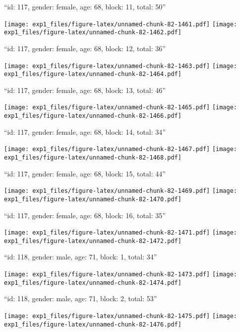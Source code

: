 \documentclass[11pt,,]{article}
\begin{document}
\newpage
[1] 

``id: 117, gender: female, age: 68, block: 11, total: 50''

\texttt{[image: exp1\_files/figure-latex/unnamed-chunk-82-1461.pdf]}
\texttt{[image: exp1\_files/figure-latex/unnamed-chunk-82-1462.pdf]}

\newpage
[1] 

``id: 117, gender: female, age: 68, block: 12, total: 36''

\texttt{[image: exp1\_files/figure-latex/unnamed-chunk-82-1463.pdf]}
\texttt{[image: exp1\_files/figure-latex/unnamed-chunk-82-1464.pdf]}

\newpage
[1] 

``id: 117, gender: female, age: 68, block: 13, total: 46''

\texttt{[image: exp1\_files/figure-latex/unnamed-chunk-82-1465.pdf]}
\texttt{[image: exp1\_files/figure-latex/unnamed-chunk-82-1466.pdf]}

\newpage
[1] 

``id: 117, gender: female, age: 68, block: 14, total: 34''

\texttt{[image: exp1\_files/figure-latex/unnamed-chunk-82-1467.pdf]}
\texttt{[image: exp1\_files/figure-latex/unnamed-chunk-82-1468.pdf]}

\newpage
[1] 

``id: 117, gender: female, age: 68, block: 15, total: 44''

\texttt{[image: exp1\_files/figure-latex/unnamed-chunk-82-1469.pdf]}
\texttt{[image: exp1\_files/figure-latex/unnamed-chunk-82-1470.pdf]}

\newpage
[1] 

``id: 117, gender: female, age: 68, block: 16, total: 35''

\texttt{[image: exp1\_files/figure-latex/unnamed-chunk-82-1471.pdf]}
\texttt{[image: exp1\_files/figure-latex/unnamed-chunk-82-1472.pdf]}

\newpage
[1] 

``id: 118, gender: male, age: 71, block: 1, total: 34''

\texttt{[image: exp1\_files/figure-latex/unnamed-chunk-82-1473.pdf]}
\texttt{[image: exp1\_files/figure-latex/unnamed-chunk-82-1474.pdf]}

\newpage
[1] 

``id: 118, gender: male, age: 71, block: 2, total: 53''

\texttt{[image: exp1\_files/figure-latex/unnamed-chunk-82-1475.pdf]}
\texttt{[image: exp1\_files/figure-latex/unnamed-chunk-82-1476.pdf]}
\end{document}
